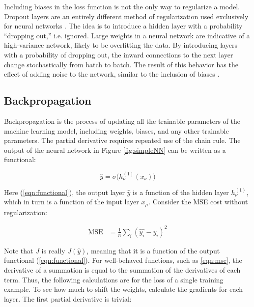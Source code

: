 Including biases in the loss function is not the only way to regularize a model. Dropout layers are an entirely different method of regularization used exclusively for neural networks \cite{dropout-srivastava2014}. The idea is to introduce a hidden layer with a probability ``dropping out,'' i.e. ignored. Large weights in a neural network are indicative of a high-variance network, likely to be overfitting the data. By introducing layers with a probability of dropping out, the inward connections to the next layer change stochastically from batch to batch. The result of this behavior has the effect of adding noise to the network, similar to the inclusion of biases \cite{conv-dropout-layers} \cite{conv-dropout-layers2}.

\subsection{Backpropagation} \label{sec:backprop}
Backpropagation is the process of updating all the trainable parameters of the machine learning model, including weights, biases, and any other trainable parameters. The partial derivative requires repeated use of the chain rule. The output of the neural network in Figure \ref{fig:simpleNN} can be written as a functional:


\begin{equation}
    \label{eqn:functional}
    \hat{y} = \sigma \bigl( h_\nu ^{(1)} \left( x_\nu \right) \bigr)
\end{equation}

\noindent Here (\ref{eqn:functional}), the output layer $ \hat{y} $ is a function of the hidden layer $ h_\nu ^{(1)} $, which in turn is a function of the input layer $ x_\mu $. Consider the MSE cost without regularization: 


\begin{align}
    \label{eqn:mse}
    \text{MSE} &= \frac{1}{n} \sum_i \left( \hat{y_i} - y_i \right)^2
\end{align}

\noindent Note that $ J $ is really $ J(\hat{y}) $, meaning that it is a function of the output functional (\ref{eqn:functional}). For well-behaved functions, such as \ref{eqn:mse}, the derivative of a summation is equal to the summation of the derivatives of each term. Thus, the following calculations are for the loss of a single training example. To see how much to shift the weights, calculate the gradients for each layer. The first partial derivative is trivial:

